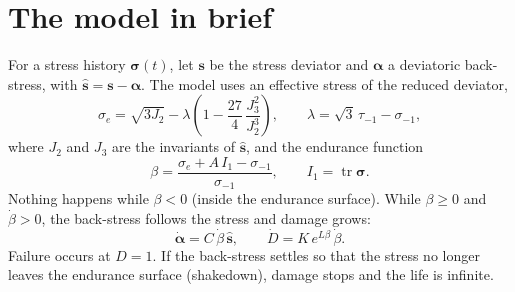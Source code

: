 \documentclass[11pt,a4paper]{article}
\newcommand{\sigm}{\sigma_{-1}}
\newcommand{\taum}{\tau_{-1}}
\begin{document}
\section{The model in brief}\label{sec:model}
\FloatBarrier

For a stress history $\boldsymbol{\sigma}(t)$, let $\mathbf{s}$ be the stress deviator and $\boldsymbol{\alpha}$ a
deviatoric back-stress, with $\hat{\mathbf{s}}=\mathbf{s}-\boldsymbol{\alpha}$. The model uses an effective stress
of the reduced deviator,
\begin{equation}
  \sigma_e = \sqrt{3J_2} - \lambda\left(1-\frac{27}{4}\,\frac{J_3^2}{J_2^3}\right),
  \qquad \lambda=\sqrt{3}\,\taum-\sigm ,
  \label{eq:se}
\end{equation}
where $J_2$ and $J_3$ are the invariants of $\hat{\mathbf{s}}$, and the endurance function
\begin{equation}
  \beta = \frac{\sigma_e + A\,I_1 - \sigm}{\sigm}, \qquad I_1=\operatorname{tr}\boldsymbol{\sigma}.
  \label{eq:beta}
\end{equation}
Nothing happens while $\beta<0$ (inside the endurance surface). While $\beta\ge 0$ and $\dot\beta>0$, the back-stress
follows the stress and damage grows:
\begin{equation}
  \dot{\boldsymbol{\alpha}} = C\,\dot\beta\,\hat{\mathbf{s}}, \qquad
  \dot D = K\,e^{L\beta}\,\dot\beta .
  \label{eq:evol}
\end{equation}
Failure occurs at $D=1$. If the back-stress settles so that the stress no longer leaves the endurance surface
(shakedown), damage stops and the life is infinite.
\end{document}
